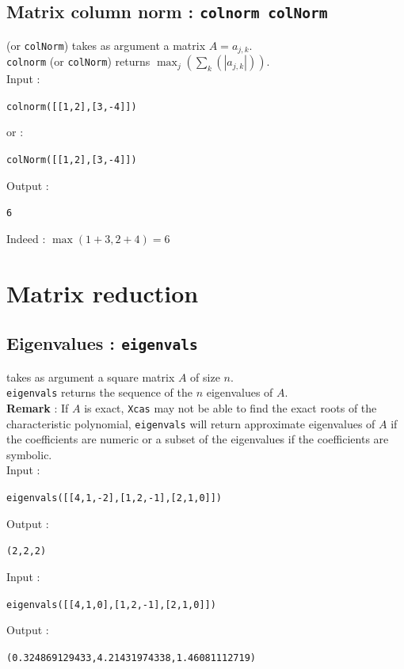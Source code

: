 \documentclass[a4paper,11pt]{book}
\begin{document}
\subsection{Matrix column norm : {\tt colnorm colNorm}}
 (or {\tt colNorm}) takes as argument a matrix 
$A=a_{j,k}$.\\
{\tt colnorm} (or {\tt colNorm}) returns $\max_j(\sum_k(|a_{j,k}|))$.\\
Input :
\begin{center}{\tt colnorm([[1,2],[3,-4]])}\end{center}
or :
\begin{center}{\tt colNorm([[1,2],[3,-4]])}\end{center}
Output :
\begin{center}{\tt 6}\end{center}
Indeed : $\max(1+3,2+4)=6$

\section{Matrix reduction}
\subsection{Eigenvalues : {\tt eigenvals}}
 takes as argument a square
matrix $A$ of size $n$.\\
{\tt eigenvals} returns the sequence of the $n$ eigenvalues of $A$.\\
{\bf Remark} : If $A$ is exact, {\tt Xcas} may not be able
to find the exact roots of the characteristic polynomial, 
{\tt eigenvals} will return approximate eigenvalues of $A$ if the
coefficients are numeric or a subset of the eigenvalues if the
coefficients are symbolic.\\
Input :
\begin{center}{\tt eigenvals([[4,1,-2],[1,2,-1],[2,1,0]])}\end{center}
Output :
\begin{center}{\tt (2,2,2) }\end{center}
Input :
\begin{center}{\tt eigenvals([[4,1,0],[1,2,-1],[2,1,0]])}\end{center}
Output :
\begin{center}{\tt (0.324869129433,4.21431974338,1.46081112719)}\end{center}
\end{document}
